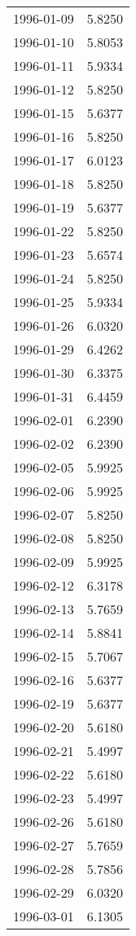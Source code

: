 \begin{tabular}{lr}
1996-01-09 &      5.8250 \\
1996-01-10 &      5.8053 \\
1996-01-11 &      5.9334 \\
1996-01-12 &      5.8250 \\
1996-01-15 &      5.6377 \\
1996-01-16 &      5.8250 \\
1996-01-17 &      6.0123 \\
1996-01-18 &      5.8250 \\
1996-01-19 &      5.6377 \\
1996-01-22 &      5.8250 \\
1996-01-23 &      5.6574 \\
1996-01-24 &      5.8250 \\
1996-01-25 &      5.9334 \\
1996-01-26 &      6.0320 \\
1996-01-29 &      6.4262 \\
1996-01-30 &      6.3375 \\
1996-01-31 &      6.4459 \\
1996-02-01 &      6.2390 \\
1996-02-02 &      6.2390 \\
1996-02-05 &      5.9925 \\
1996-02-06 &      5.9925 \\
1996-02-07 &      5.8250 \\
1996-02-08 &      5.8250 \\
1996-02-09 &      5.9925 \\
1996-02-12 &      6.3178 \\
1996-02-13 &      5.7659 \\
1996-02-14 &      5.8841 \\
1996-02-15 &      5.7067 \\
1996-02-16 &      5.6377 \\
1996-02-19 &      5.6377 \\
1996-02-20 &      5.6180 \\
1996-02-21 &      5.4997 \\
1996-02-22 &      5.6180 \\
1996-02-23 &      5.4997 \\
1996-02-26 &      5.6180 \\
1996-02-27 &      5.7659 \\
1996-02-28 &      5.7856 \\
1996-02-29 &      6.0320 \\
1996-03-01 &      6.1305 \\

\end{tabular}
